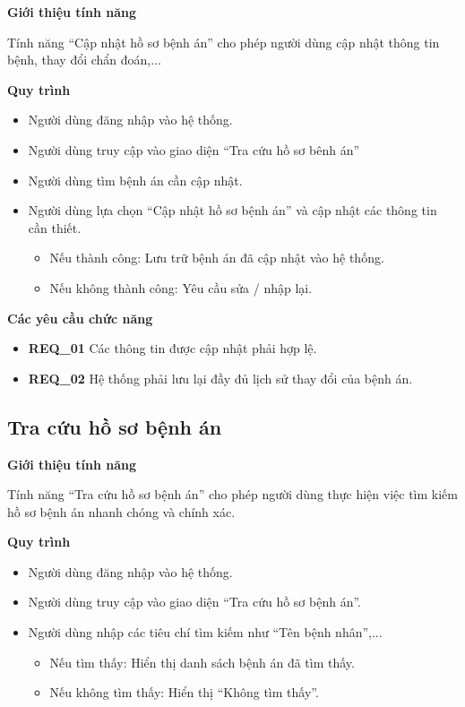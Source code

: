 \noindent \textbf{Giới thiệu tính năng}

Tính năng ``Cập nhật hồ sơ bệnh án'' cho phép người dùng cập nhật thông tin bệnh, thay đổi chẩn đoán,...

\noindent \textbf{Quy trình}
\begin{itemize}
    \item Người dùng đăng nhập vào hệ thống.
    \item Người dùng truy cập vào giao diện ``Tra cứu hồ sơ bênh án''
    \item Người dùng tìm bệnh án cần cập nhật.
    \item Người dùng lựa chọn ``Cập nhật hồ sơ bệnh án'' và cập nhật các thông tin cần thiết.
    \begin{itemize}
        \item Nếu thành công: Lưu trữ bệnh án đã cập nhật vào hệ thống.
        \item Nếu không thành công: Yêu cầu sửa / nhập lại.
    \end{itemize}
\end{itemize}

\noindent \textbf{Các yêu cầu chức năng}
\begin{itemize}
    \item \textbf{REQ\_01} Các thông tin được cập nhật phải hợp lệ.
    \item \textbf{REQ\_02} Hệ thống phải lưu lại đầy đủ lịch sử thay đổi của bệnh án.
\end{itemize}

\subsection{Tra cứu hồ sơ bệnh án}

\noindent \textbf{Giới thiệu tính năng}

Tính năng ``Tra cứu hồ sơ bệnh án'' cho phép người dùng thực hiện việc tìm kiếm hồ sơ bệnh án nhanh chóng và chính xác.

\noindent \textbf{Quy trình}
\begin{itemize}
    \item Người dùng đăng nhập vào hệ thống.
    \item Người dùng truy cập vào giao diện ``Tra cứu hồ sơ bệnh án''.
    \item Người dùng nhập các tiêu chí tìm kiếm như ``Tên bệnh nhân'',...
    \begin{itemize}
        \item Nếu tìm thấy: Hiển thị danh sách bệnh án đã tìm thấy.
        \item Nếu không tìm thấy: Hiển thị ``Không tìm thấy''.
    \end{itemize}
\end{itemize}

